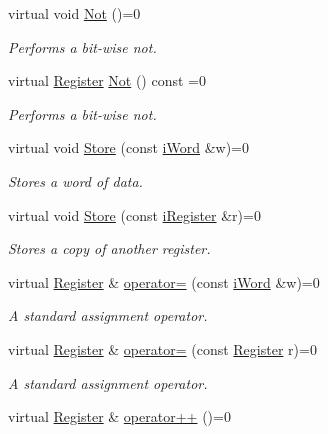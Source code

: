 \begin{DoxyCompactItemize}
virtual void \hyperlink{classiRegister_af4bbbe945b151dee3f1743c43a451cb3}{Not} ()=0
\begin{DoxyCompactList}\small\item\em Performs a bit-\/wise not. \item\end{DoxyCompactList}\item 
virtual \hyperlink{classRegister}{Register} \hyperlink{classiRegister_aca99e377de5cd1ef136a850d85143cf3}{Not} () const =0
\begin{DoxyCompactList}\small\item\em Performs a bit-\/wise not. \item\end{DoxyCompactList}\item 
virtual void \hyperlink{classiRegister_a8ffac24d1d7326e1a15f9b37cd426969}{Store} (const \hyperlink{classiWord}{iWord} \&w)=0
\begin{DoxyCompactList}\small\item\em Stores a word of data. \item\end{DoxyCompactList}\item 
virtual void \hyperlink{classiRegister_ac2b021b80a890f010fc68826e29fee47}{Store} (const \hyperlink{classiRegister}{iRegister} \&r)=0
\begin{DoxyCompactList}\small\item\em Stores a copy of another register. \item\end{DoxyCompactList}\item 
virtual \hyperlink{classRegister}{Register} \& \hyperlink{classiRegister_a16bf3f305a9588ddc85c109ac9a8b47b}{operator=} (const \hyperlink{classiWord}{iWord} \&w)=0
\begin{DoxyCompactList}\small\item\em A standard assignment operator. \item\end{DoxyCompactList}\item 
virtual \hyperlink{classRegister}{Register} \& \hyperlink{classiRegister_a3280dc5af6b828d875c57c3a3eac54d9}{operator=} (const \hyperlink{classRegister}{Register} r)=0
\begin{DoxyCompactList}\small\item\em A standard assignment operator. \item\end{DoxyCompactList}\item 
virtual \hyperlink{classRegister}{Register} \& \hyperlink{classiRegister_abca2bcea556d63fb4e3504df221cdc62}{operator++} ()=0

\end{DoxyCompactItemize}
